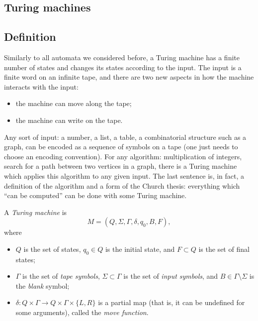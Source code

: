 \begin{page}

\section{Turing machines}
\subsection{Definition}
Similarly to all automata we considered before,
a Turing machine has a finite number of states and changes its states according to the input.
The input is a finite word on an infinite tape, and there are two new aspects in how the machine interacts with the input:
\begin{itemize}
\item
the machine can move along the tape;
\item
the machine can write on the tape.
\end{itemize}

Any sort of input: a number, a list, a table, a combinatorial structure such as a graph,
can be encoded as a sequence of symbols on a tape (one just needs to choose an encoding convention).
For any algorithm: multiplication of integers, search for a path between two vertices in a graph,
there is a Turing machine which applies this algorithm to any given input.
The last sentence is, in fact, a definition of the algorithm and a form of the Church thesis:
everything which ``can be computed'' can be done with some Turing machine.


\end{page}

\begin{page}

\begin{dfn}
A \emph{Turing machine} is
\[
M = (Q, \Sigma, \Gamma, \delta, q_0, B, F),
\]
where
\begin{itemize}
\item
$Q$ is the set of states, $q_0 \in Q$ is the initial state, and $F \subset Q$ is the set of final states;
\item
$\Gamma$ is the set of \emph{tape symbols}, $\Sigma \subset \Gamma$ is the set of \emph{input symbols},
and $B \in \Gamma \setminus \Sigma$ is the \emph{blank} symbol;
\item
$\delta \colon Q \times \Gamma \to Q \times \Gamma \times \{L, R\}$
is a partial map (that is, it can be undefined for some arguments), called the \emph{move function}.
\end{itemize}
\end{dfn}

\end{page}

